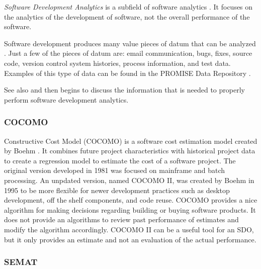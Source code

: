 \documentclass[SDSUThesis.tex]{subfiles}
\begin{document}
\textit{Software Development Analytics} is a subfield of software analytics 
\cite{Menzies2012}.  It focuses on the analytics of the development of software, not
the overall performance of the software.  

Software development produces many value pieces of datum that can be analyzed
\cite{Marcus2010}. Just a few of the pieces of datum are:
email communication, bugs, fixes, source code, version control system histories,
process information, and test data.  Examples of this type of data
can be found in the PROMISE Data Repository \cite{promise12}.

See also \cite{Buse2010} and then \cite{Buse2012} begins to discuss the 
information that is needed to properly perform software development analytics.



\subsubsection{COCOMO}  
    Constructive Cost Model (COCOMO) is a software cost estimation model created
    by Boehm \cite{Boehm1981}.  It combines future project characteristics
    with historical project data to create a regression model to estimate the 
    cost of a software project.  The original version developed in 1981 was
    focused on mainframe and batch processing.  An unpdated version, named
    COCOMO II, was created by Boehm in 1995 to be more flexible for newer 
    development practices such as desktop development, off the shelf components,
    and code reuse.  COCOMO provides a nice algorithm for making decisions
    regarding building or buying software products.  It does not provide 
    an algorithms to review past performance of estimates and modify the
    algorithm accordingly.  COCOMO II can be a useful tool for an SDO,
    but it only provides an estimate and not an evaluation of the actual
    performance.



\subsubsection{SEMAT}
\end{document}
